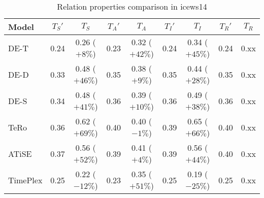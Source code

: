 \begin{table*}[htb]
\centering
\begin{minipage}{0.95\textwidth}
\centering
\caption{Relation properties comparison in icews14}
\vspace{-3mm}

\begin{tabular}{l|cc|cc|cc|cc}\hline
Model       & $T_S'$ & $T_S$ & $T_A'$ & $T_A$ & $T_I'$ & $T_I$ & $T_R'$ & $T_R$ \\ \hline
DE-T & 0.24 & 0.26 (\textcolor{textgreen}{$+8\%$}) & 0.23 & 0.32 (\textcolor{textgreen}{$+42\%$}) & 0.24 & 0.34 (\textcolor{textgreen}{$+45\%$}) & 0.24 & 0.xx \\ 
DE-D & 0.33 & 0.48 (\textcolor{textgreen}{$+46\%$}) & 0.35 & 0.38 (\textcolor{textgreen}{$+9\%$}) & 0.35 & 0.44 (\textcolor{textgreen}{$+28\%$}) & 0.35 & 0.xx \\ 
DE-S & 0.34 & 0.48 (\textcolor{textgreen}{$+41\%$}) & 0.36 & 0.39 (\textcolor{textgreen}{$+10\%$}) & 0.36 & 0.49 (\textcolor{textgreen}{$+38\%$}) & 0.36 & 0.xx \\ 
TeRo & 0.36 & 0.62 (\textcolor{textgreen}{$+69\%$}) & 0.40 & 0.40 (\textcolor{textred}{$-1\%$}) & 0.39 & 0.65 (\textcolor{textgreen}{$+66\%$}) & 0.40 & 0.xx \\ 
ATiSE & 0.37 & 0.56 (\textcolor{textgreen}{$+52\%$}) & 0.39 & 0.41 (\textcolor{textgreen}{$+4\%$}) & 0.39 & 0.56 (\textcolor{textgreen}{$+44\%$}) & 0.40 & 0.xx \\ 
TimePlex & 0.25 & 0.22 (\textcolor{textred}{$-12\%$}) & 0.23 & 0.35 (\textcolor{textgreen}{$+51\%$}) & 0.25 & 0.19 (\textcolor{textred}{$-25\%$}) & 0.25 & 0.xx \\ 
 \hline
\end{tabular}

\label{fig:relation_properties_icews14_comparison}
\end{minipage}
\end{table*}


